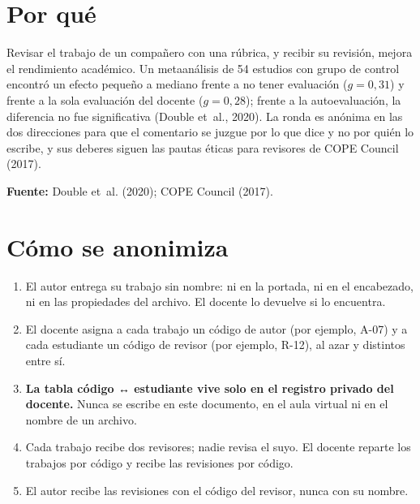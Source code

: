 \documentclass{academic-report}
\begin{document}
\encabezado

\section*{Por qué}
Revisar el trabajo de un compañero con una rúbrica, y recibir su revisión, mejora el rendimiento
académico. Un metaanálisis de 54 estudios con grupo de control encontró un efecto pequeño a
mediano frente a no tener evaluación ($g = 0{,}31$) y frente a la sola evaluación del docente
($g = 0{,}28$); frente a la autoevaluación, la diferencia no fue significativa (Double et~al.,
2020). La ronda es anónima en las dos direcciones para que el comentario se juzgue por lo que
dice y no por quién lo escribe, y sus deberes siguen las pautas éticas para revisores de COPE
Council (2017).

\noindent\textbf{Fuente:} Double et~al. (2020); COPE Council (2017).

\section*{Cómo se anonimiza}
\begin{enumerate}
  \item El autor entrega su trabajo sin nombre: ni en la portada, ni en el encabezado, ni en las
        propiedades del archivo. El docente lo devuelve si lo encuentra.
  \item El docente asigna a cada trabajo un código de autor (por ejemplo, A-07) y a cada
        estudiante un código de revisor (por ejemplo, R-12), al azar y distintos entre sí.
  \item \textbf{La tabla código ↔ estudiante vive solo en el registro privado del docente.}
        Nunca se escribe en este documento, en el aula virtual ni en el nombre de un archivo.
  \item Cada trabajo recibe dos revisores; nadie revisa el suyo. El docente reparte los
        trabajos por código y recibe las revisiones por código.
  \item El autor recibe las revisiones con el código del revisor, nunca con su nombre.
\end{enumerate}
\end{document}
